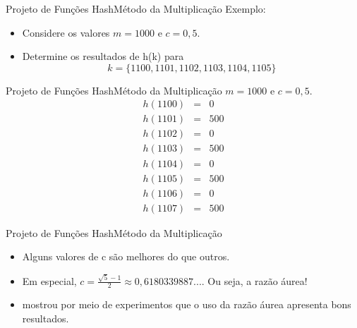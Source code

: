 \documentclass[aspectratio=169]{beamer}
\begin{document}
\begin{frame}{Projeto de Funções Hash}{Método da Multiplicação}
Exemplo:
 \begin{itemize}
 \item Considere os valores $m = 1000$ e $c = 0,5$.
 \item Determine os resultados de h(k) para
\begin{equation}
k = \{1100,1101,1102,1103,1104,1105\} \nonumber
\end{equation}  
\end{itemize}
\end{frame}

\begin{frame}{Projeto de Funções Hash}{Método da Multiplicação}
$m = 1000$ e $c = 0,5$.
\begin{eqnarray}
h(1100) &=& 0 \nonumber\\
h(1101) &=& 500 \nonumber\\
h(1102) &=&  0 \nonumber\\
h(1103) &=& 500 \nonumber\\
h(1104) &=& 0 \nonumber\\
h(1105) &=& 500 \nonumber\\
h(1106) &=& 0 \nonumber\\
h(1107) &=& 500 \nonumber
\end{eqnarray}
\end{frame}

\begin{frame}{Projeto de Funções Hash}{Método da Multiplicação}
\begin{itemize}
\item Alguns valores de c são melhores do que outros.
\item Em especial, $c = \frac{\sqrt{5} - 1}{2} \approx 0,6180339887...$. Ou seja, a razão áurea!
\item {} mostrou por meio de experimentos que o uso da razão áurea apresenta bons resultados.
\end{itemize}
\end{frame}


\end{document}
